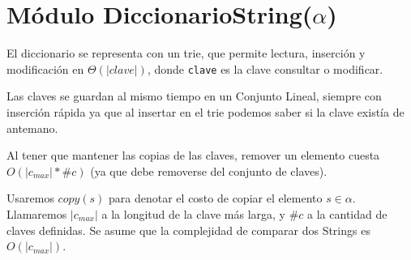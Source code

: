 \newcommand\dicString{diccString($\alpha$)}
\newcommand\itDicString{itDiccString($\alpha$)}
\renewcommand{\labelenumi}{(\Roman{enumi})}

\section{Módulo DiccionarioString(\texorpdfstring{$\alpha$}{α})}

El diccionario se representa con un trie, que permite lectura, inserción y modificación en $\Theta(|clave|)$, donde \texttt{clave} es la clave consultar o modificar.

Las claves se guardan al mismo tiempo en un Conjunto Lineal, siempre con inserción rápida ya que al insertar en el trie podemos saber si la clave existía de antemano.

Al tener que mantener las copias de las claves, remover un elemento cuesta $O(|c_{max}| * \#c)$ (ya que debe removerse del conjunto de claves).

Usaremos $copy(s)$ para denotar el costo de copiar el elemento $s \in \alpha$. Llamaremos $|c_{max}|$ a la longitud de la clave más larga, y $\#c$ a la cantidad de claves definidas. Se asume que la complejidad de comparar dos Strings es $O(|c_{max}|)$.

